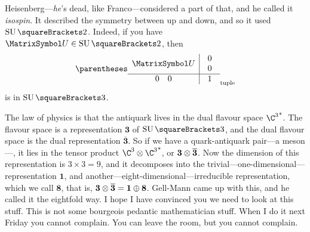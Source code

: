 \documentclass[10pt, a4paper, twoside]{lecturenotes}
\begin{document}
\begin{lecture}[date=2013-04-30, official=true]
Heisenberg---\emph{he}'s dead, like Franco---considered a part of that, and he called it \emph{isospin}. It described the symmetry between up and down, and so it used $\SpecialUnitaryGroup\of 2$. Indeed, if you have $\matU\in\SpecialUnitaryGroup\of 2$, then\[
\tuple{\begin{array}{c|c}
\matU & \begin{array}{c}
0\\0
\end{array} \\
\hline
 \begin{array}{cc}0&0\end{array} & 1
\end{array}}
\] is in $\SpecialUnitaryGroup\of 3$.

\newcommand{\three}{\mathbf 3}
\newcommand{\threebar}{\overline{\mathbf 3}}
\newcommand{\eight}{\mathbf 8}
\newcommand{\one}{\mathbf 1}

The law of physics is that the antiquark lives in the dual flavour space $\Dual{{\C^3}}$. The flavour space is a representation $\three$ of $\SpecialUnitaryGroup\of 3$, and the dual flavour space is the dual representation $\threebar$. So if we have a quark-antiquark pair---a meson---, it lies in the tensor product $\C^3\Tensor\Dual{{\C^3}}$, or $\three\Tensor\threebar$. Now the dimension of this representation is $3\times3=9$, and it decomposes into the trivial---one-dimensional---representation $\one$, and another---eight-dimensional---irreducible representation, which we call $\eight$, that is, $\three\Tensor\threebar=\one\DirectSum\eight$. Gell-Mann came up with this, and he called it the eightfold way. I hope I have convinced you we need to look at this stuff. This is not some bourgeois pedantic mathematician stuff. When I do it next Friday you cannot complain. You can leave the room, but you cannot complain.
\end{lecture}
\end{document}
